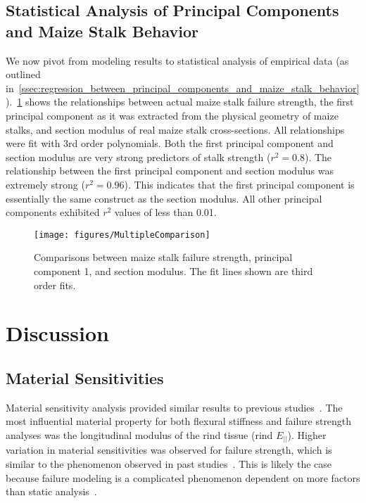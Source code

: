 \subsection{Statistical Analysis of Principal Components and Maize Stalk Behavior}
\label{ssec:statistical_analysis_of_principal_components_and_maize_stalk_behavior}
We now pivot from modeling results to statistical analysis of empirical data (as outlined in~\cref{ssec:regression_between_principal_components_and_maize_stalk_behavior}).~\cref{fig:MultipleComparison} shows the relationships between actual maize stalk failure strength, the first principal component as it was extracted from the physical geometry of maize stalks, and section modulus of real maize stalk cross-sections. All relationships were fit with 3rd order polynomials. Both the first principal component and section modulus are very strong predictors of stalk strength (${r^{2}=0.8}$). The relationship between the first principal component and section modulus was extremely strong (${r^{2}=0.96}$). This indicates that the first principal component is essentially the same construct as the section modulus.  All other principal components  exhibited ${r^{2}}$ values of less than 0.01.

\begin{figure}[htbp]
	\centering
	\texttt{[image: figures/MultipleComparison]}
	\caption[Comparisons between maize stalk failure strength, principal component 1, and section modulus.]{Comparisons between maize stalk failure strength, principal component 1, and section modulus. The fit lines shown are third order fits.}
	\label{fig:MultipleComparison}
\end{figure}

\section{Discussion}
\label{sec:ch4_discussion}

\subsection{Material Sensitivities}
\label{ssec:material_sensitivities}
Material sensitivity analysis provided similar results to previous studies~. The most influential material property for both flexural stiffness and failure strength analyses was the longitudinal modulus of the rind tissue (rind ${E_{||}}$). Higher variation in material sensitivities was observed for failure strength, which is similar to the phenomenon observed in past studies~. This is likely the case because failure modeling is a complicated phenomenon dependent on more factors than static analysis~.

